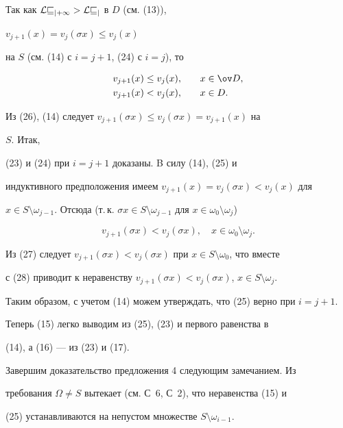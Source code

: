 


Так как $\cal L v_{j+1}>\cal L v_j$ в $D$ (см. (13)), 


$v_{j+1}(x)=v_j(\sigma x)\le v_j(x)$ 


на $S$ (см. (14) с $i=j+1$, (24) с $i=j$), то 


\begin{alignat}{2} 


v_{j+1}(x)&\le v_j(x), &\quad & x\in\ov D,\\ 


v_{j+1}(x)&<v_j(x), &\quad &x\in D. 


\end{alignat} 


Из (26), (14) следует $v_{j+1}(\sigma x)\le v_j(\sigma x)=v_{j+1}(x)$ на 


$S$. Итак, 


(23) и (24) при $i=j+1$ доказаны. B силу (14), (25) и 


индуктивного предположения имеем $v_{j+1}(x)=v_j(\sigma x)<v_j(x)$ для 


$x\in S\setminus\omega_{j-1}$. Отсюда (т.\,к. $\sigma x\in 


S\setminus\omega_{j-1}$ для $x\in\omega_0\setminus\omega_j$) 


\begin{equation} 


v_{j+1}(\sigma x)<v_j(\sigma x),\quad x\in\omega_0\setminus\omega_j. 


\end{equation} 


Из (27) следует $v_{j+1}(\sigma x)<v_j(\sigma x)$ при $x\in 


S\setminus\omega_0$, что вместе 


с (28) приводит к неравенству $v_{j+1}(\sigma x)<v_j(\sigma x)$, $x\in 


S\setminus\omega_j$. 


Таким образом, с учетом (14) можем утверждать, что (25) верно при $i=j+1$. 


Теперь (15) легко выводим из (25), (23) и первого равенства в 


(14), а (16) --- из (23) и (17). 


 


Завершим доказательство предложения 4 следующим замечанием. Из 


требования $\Omega\ne S$ вытекает (см. С~6, С~2), что неравенства (15) и 


(25) устанавливаются на непустом множестве $S\setminus\omega_{i-1}$. 


